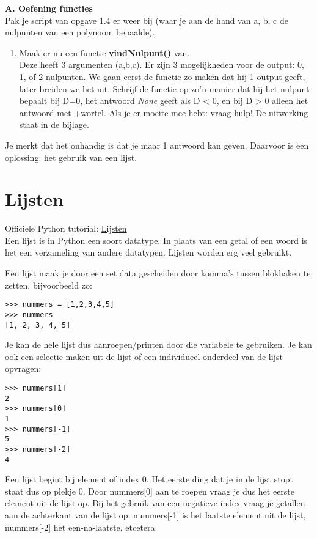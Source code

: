 \textbf{A. Oefening functies} \\
Pak je script van opgave 1.4 er weer bij (waar je aan de hand van a, b, c de nulpunten van een polynoom bepaalde).
\begin{enumerate}[label=\textbf{A.\arabic*}]
\item Maak er nu een functie \textbf{vindNulpunt()} van. 
\\Deze heeft 3 argumenten (a,b,c). Er zijn 3 mogelijkheden voor de output: 0, 1, of 2 nulpunten. We gaan eerst de functie zo maken dat hij 1 output geeft, later breiden we het uit. Schrijf de functie op zo'n manier dat hij het nulpunt bepaalt bij D=0, het antwoord \textit{None} geeft als D < 0, en bij D > 0 alleen het antwoord met +wortel. Als je er moeite mee hebt: vraag hulp! De uitwerking staat in de bijlage. 
\end{enumerate}
Je merkt dat het onhandig is dat je maar 1 antwoord kan geven. Daarvoor is een oplossing: het gebruik van een lijst.

\section{Lijsten}
Officiele Python tutorial: \href{https://docs.python.org/3/tutorial/datastructures.html
}{Lijsten} \\
Een lijst is in Python een soort datatype. In plaats van een getal of een woord is het een verzameling van andere datatypen. Lijsten worden erg veel gebruikt.

Een lijst maak je door een set data gescheiden door komma's tussen blokhaken te zetten, bijvoorbeeld zo:
\begin{lstlisting}[frame=single]
>>> nummers = [1,2,3,4,5]
>>> nummers
[1, 2, 3, 4, 5]
\end{lstlisting}
Je kan de hele lijst dus aanroepen/printen door die variabele te gebruiken. Je kan ook een selectie maken uit de lijst of een individueel onderdeel van de lijst opvragen:
\begin{lstlisting}[frame=single]
>>> nummers[1]
2
>>> nummers[0]
1
>>> nummers[-1]
5
>>> nummers[-2]
4
\end{lstlisting}
Een lijst begint bij element of index 0. Het eerste ding dat je in de lijst stopt staat dus op plekje 0. Door nummers[0] aan te roepen vraag je dus het eerste element uit de lijst op. Bij het gebruik van een negatieve index vraag je getallen aan de achterkant van de lijst op: nummers[-1] is het laatste element uit de lijst, nummers[-2] het een-na-laatste, etcetera.

